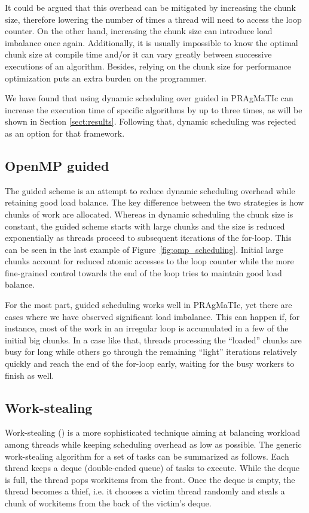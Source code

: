 \documentclass{acm_proc_article-sp}
\newcommand{\Figref}[1]{Figure~\ref{#1}}
\newcommand{\PRAGMATIC}{PRAgMaTIc\xspace}
\begin{document}
It could be argued that this overhead can be mitigated by increasing the chunk 
size, therefore lowering the number of times a thread will need to access the
loop counter. On the other hand, increasing the chunk size can introduce load
imbalance once again. Additionally, it is usually impossible to know the 
optimal chunk size at compile time and/or it can vary greatly between 
successive executions of an algorithm. Besides, relying on the chunk size for 
performance optimization puts an extra burden on the programmer.

We have found that using dynamic scheduling over guided in \PRAGMATIC can 
increase the execution time of specific algorithms by up to three times, as 
will be shown in Section \ref{sect:results}. Following that, dynamic scheduling 
was rejected as an option for that framework.

\subsection{OpenMP guided}
\label{subsect:omp_guided}
The guided scheme is an attempt to reduce dynamic scheduling overhead while 
retaining good load balance. The key difference between the two strategies is 
how chunks of work are allocated. Whereas in dynamic scheduling the chunk size 
is constant, the guided scheme starts with large chunks and the size is reduced 
exponentially as threads proceed to subsequent iterations of the for-loop. This 
can be seen in the last example of \Figref{fig:omp_scheduling}. Initial large 
chunks account for reduced atomic accesses to the loop counter while the more 
fine-grained control towards the end of the loop tries to maintain good load 
balance.

For the most part, guided scheduling works well in \PRAGMATIC, yet there are 
cases where we have observed significant load imbalance. This can happen if, 
for instance, most of the work in an irregular loop is accumulated in a few of 
the initial big chunks. In a case like that, threads processing the ``loaded'' 
chunks are busy for long while others go through the remaining ``light'' 
iterations relatively quickly and reach the end of the for-loop early, waiting 
for the busy workers to finish as well.

\subsection{Work-stealing}
\label{subsect:work_stealing}
Work-stealing (\cite{Blumofe:1994:SMC:1398518.1398998,
conf/isaac/TchiboukdjianGTRB10}) is a more sophisticated technique aiming at
balancing workload among threads while keeping scheduling overhead as low as
possible. The generic work-stealing algorithm for a set of tasks
\cite{Blumofe:1994:SMC:1398518.1398998} can be summarized as follows. Each
thread keeps a deque (double-ended queue) of tasks to execute. While the deque
is full, the thread pops workitems from the front. Once the deque is empty, the
thread becomes a thief, i.e. it chooses a victim thread randomly and steals a
chunk of workitems from the back of the victim's deque.
\end{document}
